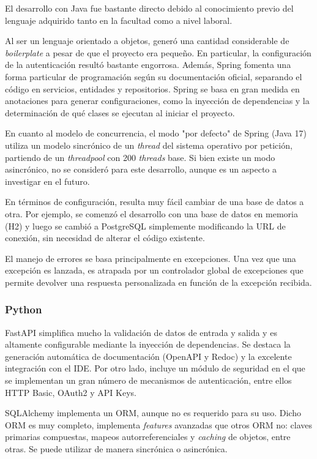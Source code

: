\documentclass[11pt]{article}
\let\Oldsubsubsection\subsubsection
\renewcommand{\subsubsection}{\FloatBarrier\Oldsubsubsection}
\newcommand{\english}[1]{\textit{#1}}
\begin{document}
El desarrollo con Java fue bastante directo debido al conocimiento previo del lenguaje adquirido tanto en la facultad como a nivel laboral.

Al ser un lenguaje orientado a objetos, generó una cantidad considerable de \textit{boilerplate} a pesar de que el proyecto era pequeño. En particular, la configuración de la autenticación resultó bastante engorrosa. Además, Spring fomenta una forma particular de programación según su documentación oficial, separando el código en servicios, entidades y repositorios. Spring se basa en gran medida en anotaciones para generar configuraciones, como la inyección de dependencias y la determinación de qué clases se ejecutan al iniciar el proyecto.

En cuanto al modelo de concurrencia, el modo "por defecto" de Spring (Java 17) utiliza un modelo sincrónico de un \english{thread} del sistema operativo por petición, partiendo de un \english{threadpool} con 200 \english{threads} base. Si bien existe un modo asincrónico, no se consideró para este desarrollo, aunque es un aspecto a investigar en el futuro.

En términos de configuración, resulta muy fácil cambiar de una base de datos a otra. Por ejemplo, se comenzó el desarrollo con una base de datos en memoria (H2) y luego se cambió a PostgreSQL simplemente modificando la URL de conexión, sin necesidad de alterar el código existente.

El manejo de errores se basa principalmente en excepciones. Una vez que una excepción es lanzada, es atrapada por un controlador global de excepciones que permite devolver una respuesta personalizada en función de la excepción recibida.


\subsubsection{Python}

FastAPI simplifica mucho la validación de datos de entrada y salida y es altamente configurable mediante la inyección de dependencias. Se destaca la generación automática de documentación (OpenAPI y Redoc) y la excelente integración con el IDE. Por otro lado, incluye un módulo de seguridad en el que se implementan un gran número de mecanismos de autenticación, entre ellos HTTP Basic, OAuth2 y API Keys.

SQLAlchemy implementa un ORM, aunque no es requerido para su uso. Dicho ORM es muy completo, implementa \english{features} avanzadas que otros ORM no: claves primarias compuestas, mapeos autorreferenciales y \english{caching} de objetos, entre otras. Se puede utilizar de manera sincrónica o asincrónica.
\end{document}

